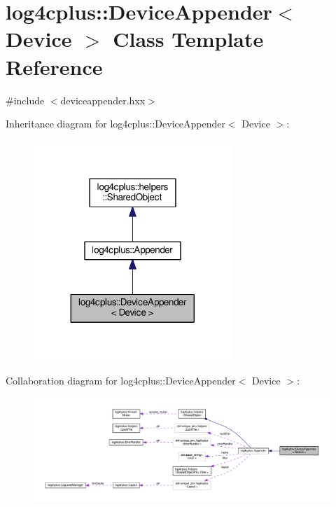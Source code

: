 \hypertarget{classlog4cplus_1_1DeviceAppender}{\section{log4cplus\-:\-:Device\-Appender$<$ Device $>$ Class Template Reference}
\label{classlog4cplus_1_1DeviceAppender}
}


{\ttfamily \#include $<$deviceappender.\-hxx$>$}



Inheritance diagram for log4cplus\-:\-:Device\-Appender$<$ Device $>$\-:
\nopagebreak
\begin{figure}[H]
\begin{center}
\leavevmode
\includegraphics[width=212pt]{classlog4cplus_1_1DeviceAppender__inherit__graph}
\end{center}
\end{figure}


Collaboration diagram for log4cplus\-:\-:Device\-Appender$<$ Device $>$\-:
\nopagebreak
\begin{figure}[H]
\begin{center}
\leavevmode
\includegraphics[width=350pt]{classlog4cplus_1_1DeviceAppender__coll__graph}
\end{center}
\end{figure}
